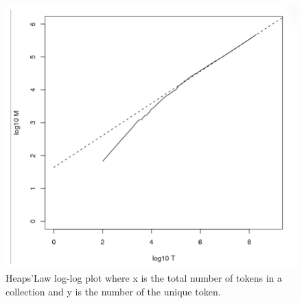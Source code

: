 \begin{figure}
    \centering
    \includegraphics[width=0.75\linewidth]{images/heapslaw.png}
    \caption{Heaps'Law log-log plot where x is the total number of tokens in a collection and y is the number of the unique token.}
    \label{fig:heapslaw}
\end{figure}


